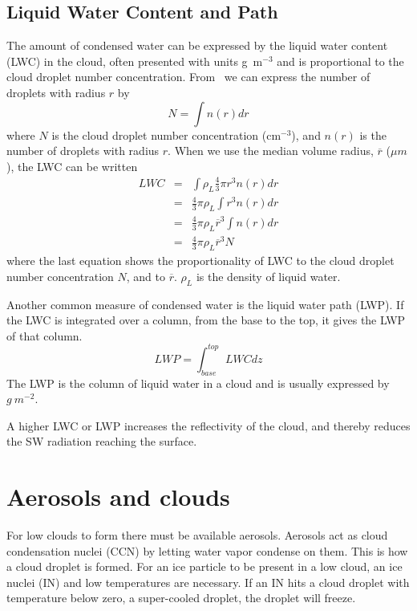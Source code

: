 
\subsection{Liquid Water Content and Path}
 The amount of condensed water can be expressed by the liquid water content (LWC) in the cloud, often presented with units g~m$^{-3}$ and is proportional to the cloud droplet number concentration. From~\citet{Rogers1989} we can express the number of droplets with radius $r$ by
\begin{equation}
N = \int n(r) dr
\end{equation}
where $N$ is the cloud droplet number concentration (cm$^{-3}$), and $n(r)$ is the number of droplets with radius $r$. When we use the median volume radius, $\overline{r}$ ($\mu m$), the LWC can be written
\begin{eqnarray}
LWC &=& \int \rho_L \frac{4}{3} \pi r^3 n(r) dr\\
&=& \frac{4}{3} \pi \rho_L \int r^3 n(r) dr\\
&=& \frac{4}{3} \pi \rho_L \overline{r}^3 \int n(r) dr\\
&=& \frac{4}{3} \pi \rho_L \overline{r}^3 N 
\end{eqnarray}
where the last equation shows the proportionality of LWC to the cloud droplet number concentration $N$, and to $\overline{r}$. $\rho_L$ is the density of liquid water.

Another common measure of condensed water is the liquid water path (LWP).
If the LWC is integrated over a column, from the base to the top, it gives the LWP of that column.
\begin{equation}
LWP = \int_{base}^{top} LWC dz
\end{equation}
The LWP is the column of liquid water in a cloud and is usually expressed by $g~m^{-2}$.

A higher LWC or LWP increases the reflectivity of the cloud, and thereby reduces the SW radiation reaching the surface.


\section{Aerosols and clouds}%
For low clouds to form there must be available aerosols. Aerosols act as cloud condensation nuclei (CCN) by letting water vapor condense on them. This is how a cloud droplet is formed. For an ice particle to be present in a low cloud, an ice nuclei (IN) and low temperatures %
are necessary. If an IN hits a cloud droplet with temperature below zero, a super-cooled droplet, the droplet will freeze.

